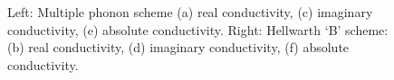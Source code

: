 \begin{figure}
{\begin{subfigure}[b]{.6\textwidth}
\end{subfigure}%
}
\caption{Left: Multiple phonon scheme (a) real conductivity, (c) imaginary conductivity, (e) absolute conductivity. Right: Hellwarth `B' scheme: (b) real conductivity, (d) imaginary conductivity, (f) absolute conductivity.}
\label{fig:multicontour}
\end{figure}

\begin{figure}
\vspace*{-1.5cm}
\end{figure}
